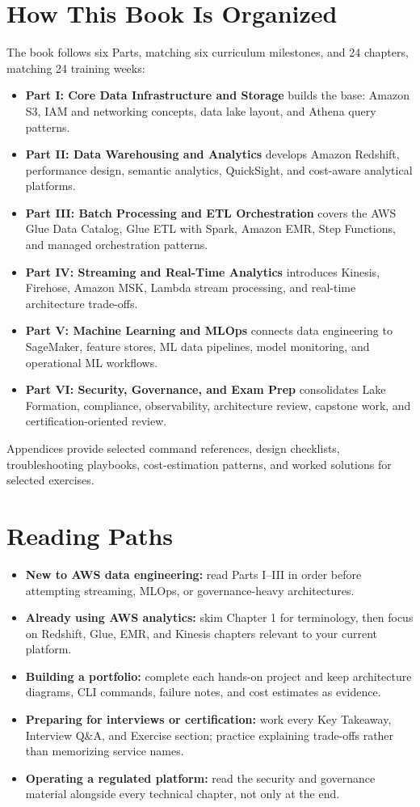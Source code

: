 \section*{How This Book Is Organized}
The book follows six Parts, matching six curriculum milestones, and 24 chapters, matching 24 training weeks:
\begin{itemize}
    \item \textbf{Part I: Core Data Infrastructure and Storage} builds the base: Amazon S3, IAM and networking concepts, data lake layout, and Athena query patterns.
    \item \textbf{Part II: Data Warehousing and Analytics} develops Amazon Redshift, performance design, semantic analytics, QuickSight, and cost-aware analytical platforms.
    \item \textbf{Part III: Batch Processing and ETL Orchestration} covers the AWS Glue Data Catalog, Glue ETL with Spark, Amazon EMR, Step Functions, and managed orchestration patterns.
    \item \textbf{Part IV: Streaming and Real-Time Analytics} introduces Kinesis, Firehose, Amazon MSK, Lambda stream processing, and real-time architecture trade-offs.
    \item \textbf{Part V: Machine Learning and MLOps} connects data engineering to SageMaker, feature stores, ML data pipelines, model monitoring, and operational ML workflows.
    \item \textbf{Part VI: Security, Governance, and Exam Prep} consolidates Lake Formation, compliance, observability, architecture review, capstone work, and certification-oriented review.
\end{itemize}
Appendices provide selected command references, design checklists, troubleshooting playbooks, cost-estimation patterns, and worked solutions for selected exercises.

\section*{Reading Paths}
\begin{itemize}
    \item \textbf{New to AWS data engineering:} read Parts I--III in order before attempting streaming, MLOps, or governance-heavy architectures.
    \item \textbf{Already using AWS analytics:} skim Chapter 1 for terminology, then focus on Redshift, Glue, EMR, and Kinesis chapters relevant to your current platform.
    \item \textbf{Building a portfolio:} complete each hands-on project and keep architecture diagrams, CLI commands, failure notes, and cost estimates as evidence.
    \item \textbf{Preparing for interviews or certification:} work every Key Takeaway, Interview Q\&A, and Exercise section; practice explaining trade-offs rather than memorizing service names.
    \item \textbf{Operating a regulated platform:} read the security and governance material alongside every technical chapter, not only at the end.
\end{itemize}

